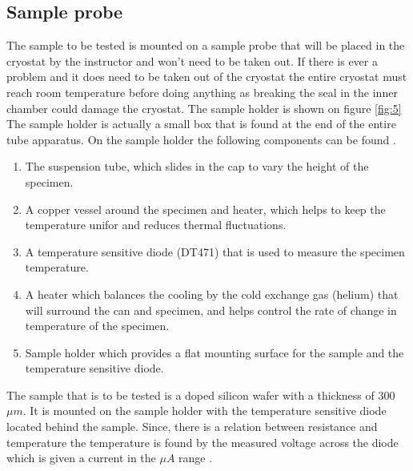 \documentclass[twocolumn]{article}
\begin{document}
\subsection{Sample probe}
The sample to be tested is mounted on a sample probe that will be placed in the 
cryostat by the instructor and won't need to be taken out. If there is ever a 
problem and it does need to be taken out of the cryostat the entire cryostat 
must reach room temperature before doing anything as breaking the seal in the 
inner chamber could damage the cryostat. The sample holder is shown on figure 
\ref{fig:5}
\\
The sample holder is actually a small box that is found at the end of the 
entire tube apparatus. On the sample holder the following components can be 
found \cite{ref:3}.
\begin{enumerate}[label=\alph*]
\item The suspension tube, which slides in the cap to vary the height of the 
specimen.
\item A copper vessel around the specimen and heater, which helps to keep the 
temperature unifor and reduces thermal fluctuations.
\item A temperature sensitive diode (DT471) that is used to measure the 
specimen temperature.
\item A heater which balances the cooling by the cold exchange gas (helium) 
that will surround the can and specimen, and helps control the rate of change 
in temperature of the specimen.
\item Sample holder which provides a flat mounting surface for the sample and 
the temperature sensitive diode.
\end{enumerate}
The sample that is to be tested is a doped silicon wafer with a thickness of 
300$\mu m$. It is mounted on the sample holder with the temperature sensitive 
diode located behind the sample. Since, there is a relation between resistance 
and temperature the temperature is found by the measured voltage across the 
diode which is given a current in the $\mu A$ range \cite{ref:3}.
\end{document}
